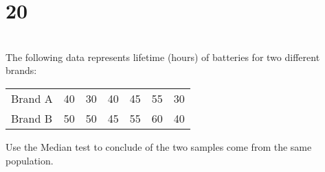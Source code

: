 \section*{20}
\vspace{-.5cm}
\hrulefill \smallskip\\
 The following data represents lifetime (hours) of batteries for two different brands:
\begin{center}
    \begin{tabular}{l*{6}{c}}
    Brand A & 40 & 30 & 40 & 45 & 55 & 30 \\
    Brand B & 50 & 50 & 45 & 55 & 60 & 40
    \end{tabular}
\end{center} Use the Median test to conclude of the two samples come from the same population.
